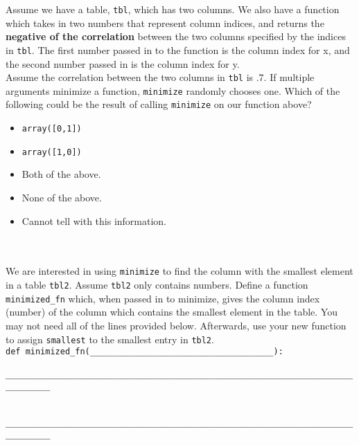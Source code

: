 
\begin{enumerate}
 Assume we have a table, {\tt tbl}, which has two columns. We also have a function which takes in two numbers that represent column indices, and returns the \textbf{negative of the correlation} between the two columns specified by the indices in {\tt tbl}. The first number passed in to the function is the column index for x, and the second number passed in is the column index for y. \\
Assume the correlation between the two columns in {\tt tbl} is .7. If multiple arguments minimize a function, {\tt minimize} randomly chooses one. Which of the following could be the result of calling {\tt minimize} on our function above?
\begin{itemize}[label=\bubble]
\item {\tt array([0,1])}
\item {\tt array([1,0])}
\item Both of the above.
\item None of the above.
\item Cannot tell with this information.
\end{itemize}
\\ \\
 We are interested in using {\tt minimize} to find the column with the smallest element in a table {\tt tbl2}. Assume {\tt tbl2} only contains numbers. Define a function {\tt minimized\_fn} which, when passed in to minimize, gives the column index (number) of the column which contains the smallest element in the table. You may not need all of the lines provided below. Afterwards, use your new function to assign {\tt smallest} to the smallest entry in {\tt tbl2}. \\

\lstinline{def minimized_fn(_____________________________________):} \\


\lstinline{	_______________________________________________________________________________} \\ \\


\lstinline{	_______________________________________________________________________________} \\ \\



\end{enumerate}
